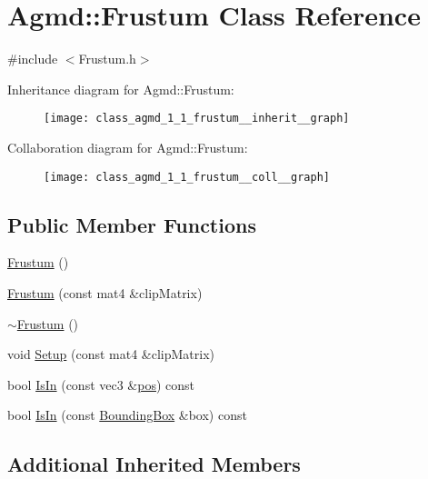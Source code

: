 \hypertarget{class_agmd_1_1_frustum}{\section{Agmd\+:\+:Frustum Class Reference}
\label{class_agmd_1_1_frustum}
}


{\ttfamily \#include $<$Frustum.\+h$>$}



Inheritance diagram for Agmd\+:\+:Frustum\+:\nopagebreak
\begin{figure}[H]
\begin{center}
\leavevmode
\texttt{[image: class\_agmd\_1\_1\_frustum\_\_inherit\_\_graph]}
\end{center}
\end{figure}


Collaboration diagram for Agmd\+:\+:Frustum\+:\nopagebreak
\begin{figure}[H]
\begin{center}
\leavevmode
\texttt{[image: class\_agmd\_1\_1\_frustum\_\_coll\_\_graph]}
\end{center}
\end{figure}
\subsection*{Public Member Functions}
\begin{DoxyCompactItemize}
\item 
\hyperlink{class_agmd_1_1_frustum_a5e5469d8c5d586a6d62e382f245b9c9d}{Frustum} ()
\item 
\hyperlink{class_agmd_1_1_frustum_ac972c636b9fbb308cda969ad45ece325}{Frustum} (const mat4 \&clip\+Matrix)
\item 
\hyperlink{class_agmd_1_1_frustum_aa930871d9b01daecf26be60ea58413e8}{$\sim$\+Frustum} ()
\item 
void \hyperlink{class_agmd_1_1_frustum_a7b23e702b7a3e6587b20b47424678fae}{Setup} (const mat4 \&clip\+Matrix)
\item 
bool \hyperlink{class_agmd_1_1_frustum_ab8b48cd2238ece317558c5fed765cebf}{Is\+In} (const vec3 \&\hyperlink{_examples_2_planet_2_app_8cpp_aa8a1c0491559faca4ebd0881575ae7f0}{pos}) const 
\item 
bool \hyperlink{class_agmd_1_1_frustum_a080c7f0f308f542e5a8d110ecb41e72b}{Is\+In} (const \hyperlink{class_agmd_1_1_bounding_box}{Bounding\+Box} \&box) const 
\end{DoxyCompactItemize}
\subsection*{Additional Inherited Members}


